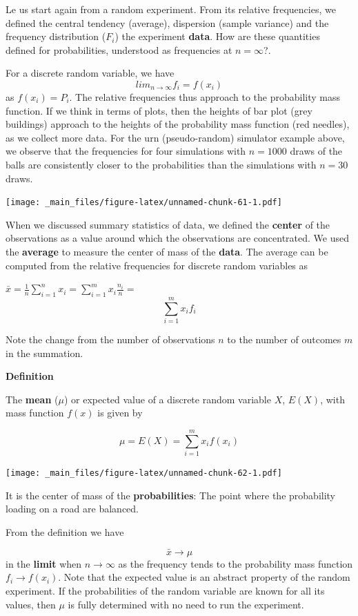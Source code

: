 \documentclass[
]{book}
\begin{document}
Le us start again from a random experiment. From its relative frequencies, we defined the central tendency (average), dispersion (sample variance) and the frequency distribution (\(F_i\)) the experiment \textbf{data}. How are these quantities defined for probabilities, understood as frequencies at \(n=\infty\)?.

For a discrete random variable, we have
\[lim_{n\rightarrow \infty} f_i=f(x_i)\]
as \(f(x_i)=P_i\). The relative frequencies thus approach to the probability mass function. If we think in terms of plots, then the heights of bar plot (grey buildings) approach to the heights of the probability mass function (red needles), as we collect more data. For the urn (pseudo-random) simulator example above, we observe that the frequencies for four simulations with \(n=1000\) draws of the balls are consistently closer to the probabilities than the simulations with \(n=30\) draws.

\texttt{[image: \_main\_files/figure-latex/unnamed-chunk-61-1.pdf]}

When we discussed summary statistics of data, we defined the \textbf{center} of the observations as a value around which the observations are concentrated. We used the \textbf{average} to measure the center of mass of the \textbf{data}. The average can be computed from the relative frequencies for discrete random variables as

\(\bar{x}= \frac{1}{n} \sum_{i=1}^n x_i = \sum_{i=1}^m x_i \frac{n_i}{n}=\) \[\sum_{i=1}^m x_i f_i\]

Note the change from the number of observations \(n\) to the number of outcomes \(m\) in the summation.

\textbf{Definition}

The \textbf{mean} (\(\mu\)) or expected value of a discrete random variable \(X\), \(E(X)\), with mass function \(f(x)\) is given by

\[ \mu = E(X)= \sum_{i=1}^m x_i f(x_i) \]

\texttt{[image: \_main\_files/figure-latex/unnamed-chunk-62-1.pdf]}

It is the center of mass of the \textbf{probabilities}: The point where the probability loading on a road are balanced.

From the definition we have

\[\bar{x} \rightarrow \mu\] in the \textbf{limit} when
\(n \rightarrow \infty\) as the frequency tends to the probability mass function \(f_i \rightarrow f(x_i)\). Note that the expected value is an abstract property of the random experiment. If the probabilities of the random variable are known for all its values, then \(\mu\) is fully determined with no need to run the experiment.
\end{document}

